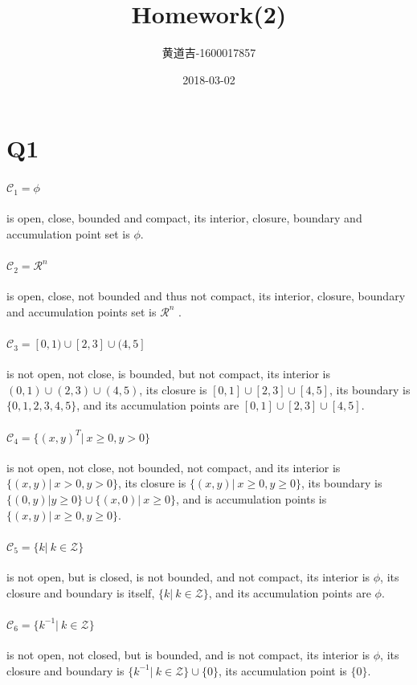 \documentclass{article}
\title{Homework(2)}
\date{2018-03-02}
\author{
  \begin{CJK}{UTF8}{gbsn}
    黄道吉-1600017857
  \end{CJK}
}
\begin{document}
\section{Q1}
  \paragraph{$\mathcal{C}_1 = \phi$}
    is open, close, bounded and compact, its interior, closure, boundary and accumulation point set is $\phi$.
  \paragraph{$\mathcal{C}_2 = \mathcal{R}^n$}
    is open, close, not bounded and thus not compact, its interior, closure, boundary and accumulation points set is $\mathcal{R}^n$ .
  \paragraph{$\mathcal{C}_3 = [0, 1) \cup [2, 3] \cup (4, 5]$}
    is not open, not close, is bounded, but not compact, its interior is $(0, 1) \cup (2, 3) \cup (4, 5)$, its closure is $[0, 1] \cup [2, 3] \cup [4, 5]$, its boundary is $\{0, 1, 2, 3, 4, 5\}$, and its accumulation points are $[0, 1] \cup [2, 3] \cup [4, 5]$.
  \paragraph{$\mathcal{C}_4 = \{(x, y)^T |\  x \geq 0, y > 0\}$}
    is not open, not close, not bounded, not compact, and its interior is $\{(x, y)|\ x > 0, y > 0\}$, its closure is $\{(x, y)|\ x \ge 0, y \ge 0\}$, its boundary is $\{(0, y)|y \ge 0 \} \cup \{(x, 0)|\ x \ge 0\}$, and is accumulation points is $\{(x, y)|\ x \ge 0, y \ge 0\}$.
  \paragraph{$\mathcal{C}_5 = \{k|\ k \in \mathcal{Z}\}$}
    is not open, but is  closed, is not bounded, and not compact, its interior is $\phi$, its closure and boundary is itself, $\{k|\ k \in \mathcal{Z}\}$, and its accumulation points are $\phi$.
  \paragraph{$\mathcal{C}_6 = \{k^{-1}|\ k \in \mathcal{Z}\}$}
    is not open, not closed, but is bounded, and is not compact, its interior is $\phi$, its closure and boundary is $\{k^{-1}|\ k \in \mathcal{Z}\} \cup \{0\}$, its accumulation point is $\{0\}$.
\end{document}
